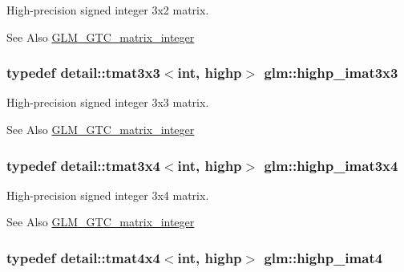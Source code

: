 High-\/precision signed integer 3x2 matrix. \begin{DoxySeeAlso}{See Also}
\hyperlink{group__gtc__matrix__integer}{G\-L\-M\-\_\-\-G\-T\-C\-\_\-matrix\-\_\-integer} 
\end{DoxySeeAlso}
\hypertarget{group__gtc__matrix__integer_ga4e7c11e49de5d71067b95a87c84308a8}{
\subsubsection[{highp\-\_\-imat3x3}]{\setlength{\rightskip}{0pt plus 5cm}typedef detail\-::tmat3x3$<$int, highp$>$ {\bf glm\-::highp\-\_\-imat3x3}}}\label{group__gtc__matrix__integer_ga4e7c11e49de5d71067b95a87c84308a8}
High-\/precision signed integer 3x3 matrix. \begin{DoxySeeAlso}{See Also}
\hyperlink{group__gtc__matrix__integer}{G\-L\-M\-\_\-\-G\-T\-C\-\_\-matrix\-\_\-integer} 
\end{DoxySeeAlso}
\hypertarget{group__gtc__matrix__integer_ga97ddf84f7ae0c5d4d3ecc18bb1d47449}{
\subsubsection[{highp\-\_\-imat3x4}]{\setlength{\rightskip}{0pt plus 5cm}typedef detail\-::tmat3x4$<$int, highp$>$ {\bf glm\-::highp\-\_\-imat3x4}}}\label{group__gtc__matrix__integer_ga97ddf84f7ae0c5d4d3ecc18bb1d47449}
High-\/precision signed integer 3x4 matrix. \begin{DoxySeeAlso}{See Also}
\hyperlink{group__gtc__matrix__integer}{G\-L\-M\-\_\-\-G\-T\-C\-\_\-matrix\-\_\-integer} 
\end{DoxySeeAlso}
\hypertarget{group__gtc__matrix__integer_ga9ca2f5624891bd1ac993fcde4dd24ac1}{
\subsubsection[{highp\-\_\-imat4}]{\setlength{\rightskip}{0pt plus 5cm}typedef detail\-::tmat4x4$<$int, highp$>$ {\bf glm\-::highp\-\_\-imat4}}}\label{group__gtc__matrix__integer_ga9ca2f5624891bd1ac993fcde4dd24ac1}
